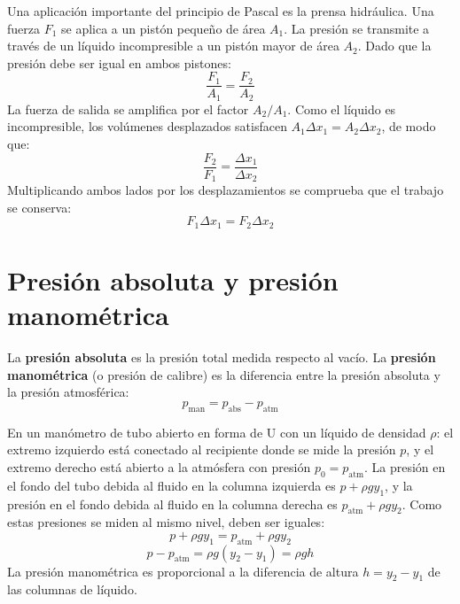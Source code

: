 Una aplicación importante del principio de Pascal es la prensa hidráulica. Una fuerza $F_1$ se aplica a un pistón pequeño de área $A_1$. La presión se transmite a través de un líquido incompresible a un pistón mayor de área $A_2$. Dado que la presión debe ser igual en ambos pistones:
\begin{equation}
    \frac{F_1}{A_1} = \frac{F_2}{A_2}
\end{equation}
La fuerza de salida se amplifica por el factor $A_2/A_1$. Como el líquido es incompresible, los volúmenes desplazados satisfacen $A_1\Delta x_1 = A_2\Delta x_2$, de modo que:
\begin{equation}
    \frac{F_2}{F_1} = \frac{\Delta x_1}{\Delta x_2}
\end{equation}
Multiplicando ambos lados por los desplazamientos se comprueba que el trabajo se conserva:
\begin{equation}
    F_1\Delta x_1 = F_2\Delta x_2
\end{equation}

\section{Presión absoluta y presión manométrica}

La \textbf{presión absoluta} es la presión total medida respecto al vacío. La \textbf{presión manométrica} (o presión de calibre) es la diferencia entre la presión absoluta y la presión atmosférica:
\begin{equation}
    p_{\text{man}} = p_{\text{abs}} - p_{\text{atm}}
\end{equation}

En un manómetro de tubo abierto en forma de U con un líquido de densidad $\rho$: el extremo izquierdo está conectado al recipiente donde se mide la presión $p$, y el extremo derecho está abierto a la atmósfera con presión $p_0 = p_{\text{atm}}$. La presión en el fondo del tubo debida al fluido en la columna izquierda es $p + \rho g y_1$, y la presión en el fondo debida al fluido en la columna derecha es $p_{\text{atm}} + \rho g y_2$. Como estas presiones se miden al mismo nivel, deben ser iguales:
\begin{equation}
    p + \rho g y_1 = p_{\text{atm}} + \rho g y_2
\end{equation}
\begin{equation}
    p - p_{\text{atm}} = \rho g(y_2 - y_1) = \rho g h
\end{equation}
La presión manométrica es proporcional a la diferencia de altura $h = y_2 - y_1$ de las columnas de líquido.

